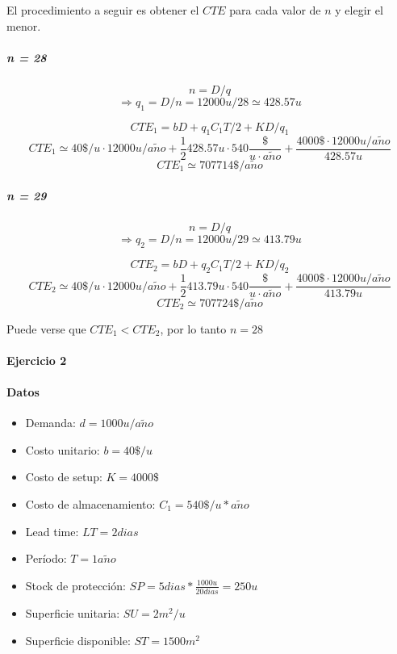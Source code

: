 \documentclass[a4paper,10pt]{article}
\def \anio {a\tilde{n}o}
\begin{document}
	El procedimiento a seguir es obtener el $CTE$ para cada valor de $n$ y elegir el menor.

	\subparagraph{n = 28}
	$$ n = D / q $$
	$$\Rightarrow q_1 = D / n = 12000u/28 \simeq 428.57u $$

        $$ CTE_1 = b D + q_1 C_1 T / 2 + K D / q_1 $$
        $$ CTE_1 \simeq 40\$/u \cdot 12000u/\anio + \frac{1}{2} 428.57u \cdot 540\frac{\$}{u\cdot\anio} + \frac{4000\$ \cdot 12000u/\anio}{428.57u} $$
        $$ CTE_1 \simeq 707714 \$/\anio $$

	\subparagraph{n = 29}
	$$ n = D / q $$
	$$\Rightarrow q_2 = D / n = 12000u/29 \simeq 413.79u $$

        $$ CTE_2 = b D + q_2 C_1 T / 2 + K D / q_2 $$
        $$ CTE_2 \simeq 40\$/u \cdot 12000u/\anio + \frac{1}{2} 413.79u \cdot 540\frac{\$}{u\cdot\anio} + \frac{4000\$ \cdot 12000u/\anio}{413.79u} $$
        $$ CTE_2 \simeq 707724 \$/\anio $$

        Puede verse que $CTE_1 < CTE_2$, por lo tanto $ \boxed{ n = 28 } $

\paragraph{Ejercicio 2}
  \paragraph{Datos}
    \begin{itemize}
      \item Demanda: $d = 1000u/\anio$
      \item Costo unitario: $b = 40\$/u$
      \item Costo de setup: $K = 4000\$$ 
      \item Costo de almacenamiento: $C_1 = 540\$/u * \anio$
      \item Lead time: $LT = 2dias$
      \item Período: $T = 1\anio$
      \item Stock de protección: $ SP = 5dias * \frac{1000u}{20dias} = 250u$
      \item Superficie unitaria: $ SU = 2m^2/u$
      \item Superficie disponible: $ ST = 1500m^2$
    \end{itemize}
\end{document}
